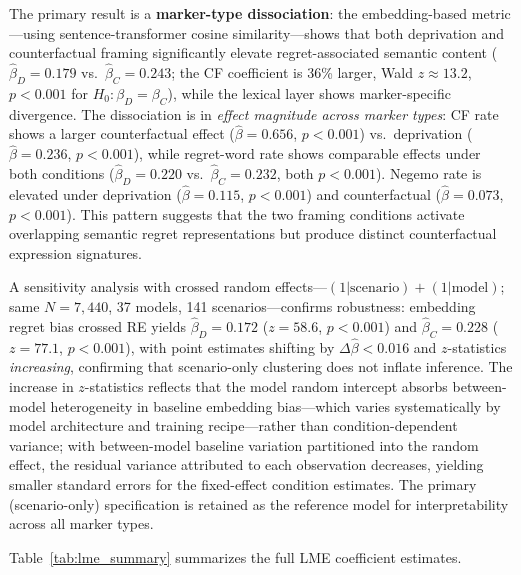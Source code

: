 \documentclass[11pt]{article}
\begin{document}
The primary result is a \textbf{marker-type dissociation}: the embedding-based metric---using sentence-transformer cosine similarity---shows that both deprivation and counterfactual framing significantly elevate regret-associated semantic content ($\hat{\beta}_D=0.179$ vs.\ $\hat{\beta}_C=0.243$; the CF coefficient is 36\% larger, Wald $z\approx13.2$, $p<0.001$ for $H_0\!:\beta_D=\beta_C$), while the lexical layer shows marker-specific divergence. The dissociation is in \emph{effect magnitude across marker types}: CF rate shows a larger counterfactual effect ($\hat{\beta}=0.656$, $p<0.001$) vs.\ deprivation ($\hat{\beta}=0.236$, $p<0.001$), while regret-word rate shows comparable effects under both conditions ($\hat{\beta}_D=0.220$ vs.\ $\hat{\beta}_C=0.232$, both $p<0.001$). Negemo rate is elevated under deprivation ($\hat{\beta}=0.115$, $p<0.001$) and counterfactual ($\hat{\beta}=0.073$, $p<0.001$). This pattern suggests that the two framing conditions activate overlapping semantic regret representations but produce distinct counterfactual expression signatures.

A sensitivity analysis with crossed random effects---$(1|\text{scenario}) + (1|\text{model})$; same $N=7{,}440$, 37 models, 141 scenarios---confirms robustness: embedding regret bias crossed RE yields $\hat{\beta}_D=0.172$ ($z=58.6$, $p<0.001$) and $\hat{\beta}_C=0.228$ ($z=77.1$, $p<0.001$), with point estimates shifting by $\Delta\hat{\beta}<0.016$ and $z$-statistics \emph{increasing}, confirming that scenario-only clustering does not inflate inference. The increase in $z$-statistics reflects that the model random intercept absorbs between-model heterogeneity in baseline embedding bias---which varies systematically by model architecture and training recipe---rather than condition-dependent variance; with between-model baseline variation partitioned into the random effect, the residual variance attributed to each observation decreases, yielding smaller standard errors for the fixed-effect condition estimates. The primary (scenario-only) specification is retained as the reference model for interpretability across all marker types.

Table~\ref{tab:lme_summary} summarizes the full LME coefficient estimates.
\end{document}
